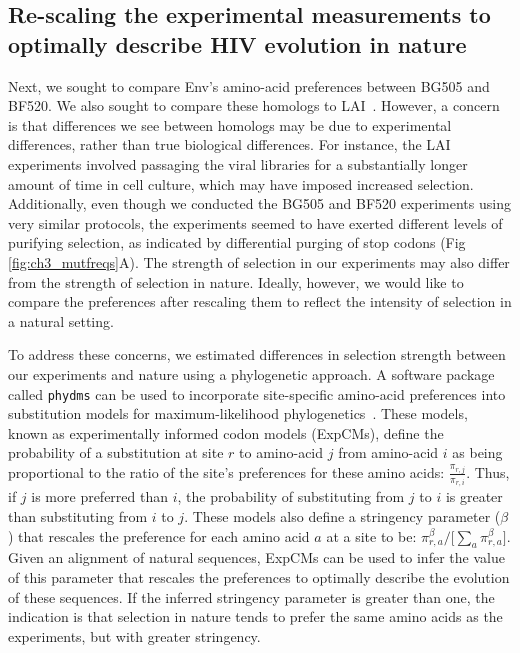 \documentclass[9pt,lineno]{elife}
\begin{document}
\subsection*{Re-scaling the experimental measurements to optimally describe HIV evolution in nature}
Next, we sought to compare Env's amino-acid preferences between BG505 and BF520.
We also sought to compare these homologs to LAI~\cite{haddox2016experimental}.
However, a concern is that differences we see between homologs may be due to experimental differences, rather than true biological differences.
For instance, the LAI experiments involved passaging the viral libraries for a substantially longer amount of time in cell culture, which may have imposed increased selection.
Additionally, even though we conducted the BG505 and BF520 experiments using very similar protocols, the experiments seemed to have exerted different levels of purifying selection, as indicated by differential purging of stop codons (Fig \ref{fig:ch3_mutfreqs}A).
The strength of selection in our experiments may also differ from the strength of selection in nature.
Ideally, however, we would like to compare the preferences after rescaling them to reflect the intensity of selection in a natural setting.

To address these concerns, we estimated differences in selection strength between our experiments and nature using a phylogenetic approach.
A software package called \texttt{phydms} can be used to incorporate site-specific amino-acid preferences into substitution models for maximum-likelihood phylogenetics~\cite{hilton2017phydms}.
These models, known as experimentally informed codon models (ExpCMs), define the probability of a substitution at site $r$ to amino-acid $j$ from amino-acid $i$ as being proportional to the ratio of the site's preferences for these amino acids: $\frac{\pi_{r,j}}{\pi_{r,i}}$.
Thus, if $j$ is more preferred than $i$, the probability of substituting from $j$ to $i$ is greater than substituting from $i$ to $j$.
These models also define a stringency parameter ($\beta$) that rescales the preference for each amino acid $a$ at a site to be: $\pi_{r,a}^{\beta} / \lbrack \sum_{a} \pi_{r,a}^{\beta} \rbrack$.
Given an alignment of natural sequences, ExpCMs can be used to infer the value of this parameter that rescales the preferences to optimally describe the evolution of these sequences.
If the inferred stringency parameter is greater than one, the indication is that selection in nature tends to prefer the same amino acids as the experiments, but with greater stringency.
\end{document}
